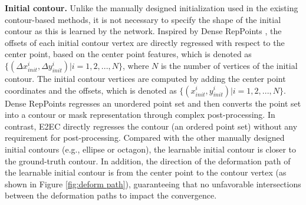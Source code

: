 \documentclass[10pt,twocolumn,letterpaper]{article}
\begin{document}
\textbf{Initial contour.} Unlike the manually designed initialization used in the existing contour-based methods, it is not necessary to specify the shape of the initial contour as this is learned by the network. Inspired by Dense RepPoints \cite{densereppoints}, the offsets of each initial contour vertex are directly regressed with respect to the center point, based on the center point features, which is denoted as $\{(\Delta x_{init}^{i},\Delta y_{init}^{i})|i=1,2,...,N\}$, where $N$ is the number of vertices of the initial contour. The initial contour vertices are computed by adding the center point coordinates and the offsets, which is denoted as $\{(x_{init}^{i},y_{init}^{i})|i=1,2,...,N\}$. Dense RepPoints regresses an unordered point set and then converts the point set into a contour or mask representation through complex post-processing. In contrast, E2EC directly regresses the contour (an ordered point set) without any requirement for post-processing. Compared with the other manually designed initial contours (e.g., ellipse or octagon), the learnable initial contour is closer to the ground-truth contour. In addition, the direction of the deformation path of the learnable initial contour is from the center point to the contour vertex (as shown in Figure \ref{fig:deform path}), guaranteeing that no unfavorable intersections between the deformation paths to impact the convergence.
\end{document}
